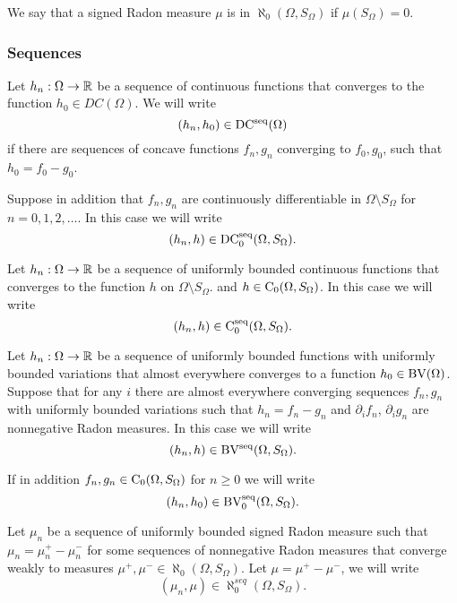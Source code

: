 \documentclass[a4paper,10pt]{article}
\begin{document}
We say that a signed Radon measure $\mu$ is in
$\aleph_0(\Omega,S_\Omega)$ if $\mu(S_\Omega)=0$.



\subsubsection{Sequences}
Let $h_n:\Omega\to\mathbb{R}$ be a sequence of continuous functions that
converges to the function $h_0\in DC(\Omega)$.
We will write 
$$(h_n,h_0)\in \operatorname{DC^{seq}}(\Omega)$$
if
there are sequences of concave functions $f_n,g_n$ converging to
$f_0,g_0$, such that 
$h_0=f_0-g_0$.

Suppose in addition that 
$f_n,g_n$ are  continuously differentiable in
$\Omega\setminus S_\Omega$ for $n=0,1,2,\dots$.
In this case we will write 
$$(h_n,h)\in \operatorname{DC_0^{seq}}(\Omega,S_\Omega).$$



Let $h_n:\Omega\to\mathbb{R}$ be a sequence of
uniformly bounded continuous 
functions
that
converges  to the function $h$
 on
$\Omega\setminus S_\Omega$.
 and  $h\in \operatorname{C_0}(\Omega,S_\Omega)$. 
In this case we will write 
$$(h_n,h)\in \operatorname{C_0^{seq}}(\Omega,S_\Omega).$$

Let $h_n:\Omega\to\mathbb{R}$ be a sequence of uniformly bounded functions
with uniformly bounded variations
that
almost everywhere converges  to a function $h_0\in\operatorname{BV}(\Omega)$.
 Suppose that for any $i$ there are
 almost everywhere converging  sequences
 $f_n, g_n$ with uniformly bounded variations
  such that 
 $h_n=f_n- g_n$ and
 $\partial_i f_n$,
 $\partial_i  g_n$ are
 nonnegative Radon measures.
  In this case we will write 
$$(h_n,h)\in \operatorname{BV^{seq}}(\Omega,S_\Omega).$$

If in addition $f_n, g_n\in\operatorname{C_0}(\Omega,S_\Omega)$ for
$n\ge 0$ we
will write 
$$(h_n,h_0)\in \operatorname{BV_0^{seq}}(\Omega,S_\Omega).$$





Let $\mu_n$ be
  a sequence of uniformly bounded
signed Radon measure  such that
$\mu_n=\mu_n^+-\mu_n^-$
for some
sequences of nonnegative Radon measures
that converge weakly to measures $\mu^+,
\mu^-\in\aleph_0(\Omega,S_\Omega)$.
Let $\mu=\mu^+-\mu^-$,
we will write
$$(\mu_n,\mu)\in\aleph_0^{seq}(\Omega,S_\Omega).$$
\end{document}
